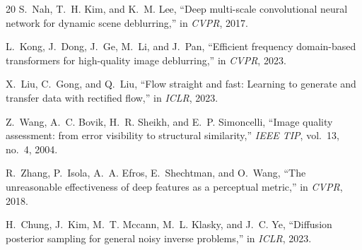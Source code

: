 \documentclass{article}
\begin{document}
\begin{thebibliography}{20}
S.~Nah, T.~H. Kim, and K.~M. Lee,
``Deep multi-scale convolutional neural network for dynamic scene deblurring,'' in \emph{CVPR}, 2017.

L.~Kong, J.~Dong, J.~Ge, M.~Li, and J.~Pan,
``Efficient frequency domain-based transformers for high-quality image deblurring,'' in \emph{CVPR}, 2023.

X.~Liu, C.~Gong, and Q.~Liu,
``Flow straight and fast: Learning to generate and transfer data with rectified flow,'' in \emph{ICLR}, 2023.

Z.~Wang, A.~C. Bovik, H.~R. Sheikh, and E.~P. Simoncelli,
``Image quality assessment: from error visibility to structural similarity,'' \emph{IEEE TIP}, vol.~13, no.~4, 2004.

R.~Zhang, P.~Isola, A.~A. Efros, E.~Shechtman, and O.~Wang,
``The unreasonable effectiveness of deep features as a perceptual metric,'' in \emph{CVPR}, 2018.

H.~Chung, J.~Kim, M.~T. Mccann, M.~L. Klasky, and J.~C. Ye,
``Diffusion posterior sampling for general noisy inverse problems,'' in \emph{ICLR}, 2023.

\end{thebibliography}
\end{document}
